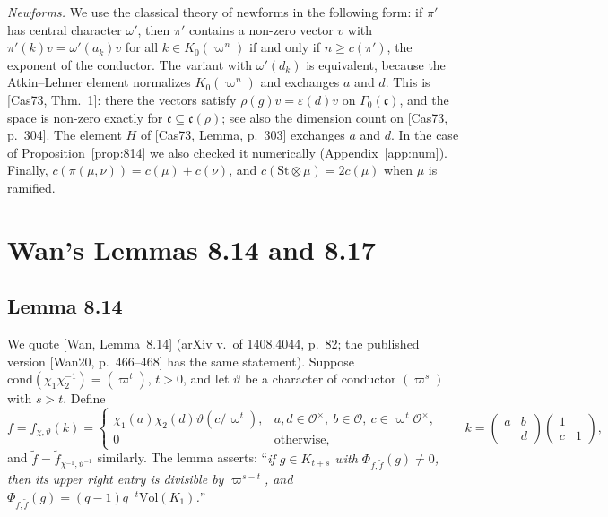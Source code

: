\documentclass[11pt]{amsart}
\theoremstyle{definition}
\theoremstyle{remark}
\newcommand{\cO}{\mathcal{O}}
\newcommand{\cond}{\mathrm{cond}}
\newcommand{\Vol}{\mathrm{Vol}}
\newcommand{\vp}{\varpi}
\newcommand{\St}{\mathrm{St}}
\begin{document}
\emph{Newforms.} We use the classical theory of newforms in the following form: if $\pi'$ has central character $\omega'$, then $\pi'$ contains a non-zero vector $v$ with $\pi'(k)v=\omega'(a_k)v$ for all $k\in K_0(\vp^n)$ if and only if $n\ge c(\pi')$, the exponent of the conductor. The variant with $\omega'(d_k)$ is equivalent, because the Atkin--Lehner element normalizes $K_0(\vp^n)$ and exchanges $a$ and $d$. This is [Cas73, Thm.~1]: there the vectors satisfy $\rho(g)v=\varepsilon(d)v$ on $\Gamma_0(\mathfrak c)$, and the space is non-zero exactly for $\mathfrak c\subseteq\mathfrak c(\rho)$; see also the dimension count on [Cas73, p.~304]. The element $H$ of [Cas73, Lemma, p.~303] exchanges $a$ and $d$. In the case of Proposition~\ref{prop:814} we also checked it numerically (Appendix~\ref{app:num}). Finally, $c(\pi(\mu,\nu))=c(\mu)+c(\nu)$, and $c(\St\otimes\mu)=2c(\mu)$ when $\mu$ is ramified.

\section{Wan's Lemmas 8.14 and 8.17}\label{sec:wan}

\subsection{Lemma 8.14}
We quote [Wan, Lemma~8.14] (arXiv v.\ of 1408.4044, p.~82; the published version [Wan20, p.~466--468] has the same statement). Suppose $\cond(\chi_1\chi_2^{-1})=(\vp^t)$, $t>0$, and let $\vartheta$ be a character of conductor $(\vp^s)$ with $s>t$. Define
\[
f=f_{\chi,\vartheta}(k)=\begin{cases}\chi_1(a)\chi_2(d)\vartheta(c/\vp^t), & a,d\in\cO^\times,\ b\in\cO,\ c\in \vp^t\cO^\times,\\ 0 & \text{otherwise},\end{cases}\qquad k=\begin{pmatrix}a&b\\&d\end{pmatrix}\begin{pmatrix}1&\\c&1\end{pmatrix},
\]
and $\tilde f=\tilde f_{\chi^{-1},\vartheta^{-1}}$ similarly. The lemma asserts: ``\emph{if $g\in K_{t+s}$ with $\Phi_{f,\tilde f}(g)\neq0$, then its upper right entry is divisible by $\vp^{s-t}$, and $\Phi_{f,\tilde f}(g)=(q-1)q^{-t}\Vol(K_1)$.}''
\end{document}
